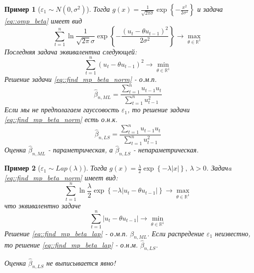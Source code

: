 \documentclass[12pt]{article}
\newtheorem*{example}{Пример}
\theoremstyle{basic_theorem}
\def\eps{ \varepsilon }
\def\R{ \mathbb{R} }
\begin{document}
\begin{example}[$\eps_1\sim N(0,\sigma^2)$]
    Тогда $g(x)=\frac{1}{\sqrt{2\pi\sigma}}\exp{\left\{-\frac{x^2}{2\sigma^2}\right\}}$
    и задача \eqref{eq::omp_beta} имеет вид
    \[\sum_{t=1}^n\ln\frac{1}{\sqrt{2\pi}\sigma}\exp{\left\{-\frac{(u_t-\theta u_{t-1})^2}{2\sigma^2}\right\}}\rightarrow\max_{\theta\in\R^1}\]
    Последняя задача эквивалентна следующей:
    \begin{equation}\label{eq::find_mp_beta_norm}
        \sum_{t=1}^n(u_t-\theta u_{t-1})^2\rightarrow\min_{\theta\in\R^1}
    \end{equation}
    Решение задачи \eqref{eq::find_mp_beta_norm} - о.м.п.
    \begin{equation}
        \widehat{\beta}_{n, ML}=\frac{\sum_{t=1}^nu_{t-1}u_t}{\sum_{t=1}^nu_{t-1}^2}
    \end{equation}
    Если мы не предполагаем гауссовость $\eps_1$, то решение задачи \eqref{eq::find_mp_beta_norm} есть о.н.к.
    \begin{equation}
        \widehat{\beta}_{n,LS}=\frac{\sum_{t=1}^nu_{t-1}u_t}{\sum_{t=1}^nu^2_{t-1}}
    \end{equation}
    Оценка $\widehat{\beta}_{n, ML}$ - параметрическая, а $\widehat{\beta}_{n, LS}$ - непараметрическая.
\end{example}
\begin{example}[$\eps_1\sim Lap(\lambda)$]
    Тогда $g(x)=\frac{\lambda}{2}\exp{\left\{-\lambda|x|\right\}},\ \lambda>0$. Задачa \eqref{eq::find_mp_beta_norm} имеет вид:
    \[\sum_{t=1}^n\ln\frac{\lambda}{2}\exp{\left\{-\lambda|u_t-\theta u_{t-1}|\right\}}\rightarrow\max_{\theta\in\R^1}\]
    что эквивалентно задаче
    \begin{equation}\label{eq::find_mp_beta_lap}
        \sum_{t=1}^n|u_t-\theta u_{t-1}|\rightarrow\min_{\theta\in\R^1}
    \end{equation}
    Решение \eqref{eq::find_mp_beta_lap} - о.м.п. $\widehat{\beta}_{n,ML}$.
    Если распредение $\eps_1$ неизвестно, то решение \eqref{eq::find_mp_beta_lap} - о.н.м. $\widehat{\beta}_{n,LS}$.

    Оценка $\widehat{\beta}_{n,LS}$ не выписывается явно!
\end{example}
\end{document}
